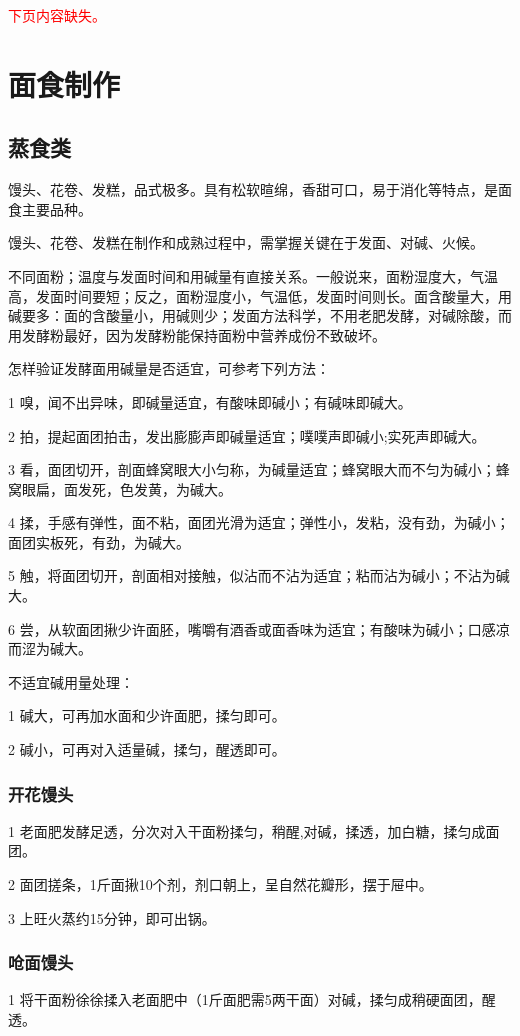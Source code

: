 \documentclass{ctexbook}
\begin{document}
\textcolor{red}{下页内容缺失。}
\chapter{面食制作}
\section{蒸食类}
馒头、花卷、发糕，品式极多。具有松软暄绵，香甜可口，易于消化等特点，是面食主要品种。

馒头、花卷、发糕在制作和成熟过程中，需掌握关键在于发面、对碱、火候。

不同面粉；温度与发面时间和用碱量有直接关系。一般说来，面粉湿度大，气温高，发面时间要短；反之，面粉湿度小，气温低，发面时间则长。面含酸量大，用碱要多：面的含酸量小，用碱则少；发面方法科学，不用老肥发酵，对碱除酸，而用发酵粉最好，因为发酵粉能保持面粉中营养成份不致破坏。

怎样验证发酵面用碱量是否适宜，可参考下列方法：

1 嗅，闻不出异味，即碱量适宜，有酸味即碱小；有碱味即碱大。

2 拍，提起面团拍击，发出膨膨声即碱量适宜；噗噗声即碱小;实死声即碱大。

3 看，面团切开，剖面蜂窝眼大小匀称，为碱量适宜；蜂窝眼大而不匀为碱小；蜂窝眼扁，面发死，色发黄，为碱大。

4 揉，手感有弹性，面不粘，面团光滑为适宜；弹性小，发粘，没有劲，为碱小；面团实板死，有劲，为碱大。

5 触，将面团切开，剖面相对接触，似沾而不沾为适宜；粘而沾为碱小；不沾为碱大。

6 尝，从软面团揪少许面胚，嘴嚼有酒香或面香味为适宜；有酸味为碱小；口感凉而涩为碱大。

不适宜碱用量处理：

1 碱大，可再加水面和少许面肥，揉匀即可。

2 碱小，可再对入适量碱，揉匀，醒透即可。
\subsection{开花馒头}
1 老面肥发酵足透，分次对入干面粉揉匀，稍醒,对碱，揉透，加白糖，揉匀成面团。

2 面团搓条，1斤面揪10个剂，剂口朝上，呈自然花瓣形，摆于屉中。

3 上旺火蒸约15分钟，即可出锅。
\subsection{呛面馒头}
1 将干面粉徐徐揉入老面肥中（1斤面肥需5两干面）对碱，揉匀成稍硬面团，醒透。
\end{document}
